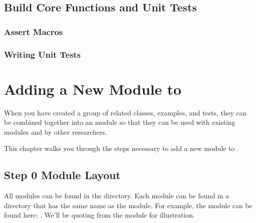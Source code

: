 \documentclass[letterpaper,10pt,english]{sphinxmanual}
\renewcommand{\sphinxcode}[1]{\texttt{\small{#1}}}
\begin{document}
\begin{sphinxVerbatim}[commandchars=\\\{\}]
  
       
     
     
     
\end{sphinxVerbatim}


\subsection{Build Core Functions and Unit Tests}
\label{\detokenize{new-models:build-core-functions-and-unit-tests}}

\subsubsection{Assert Macros}
\label{\detokenize{new-models:assert-macros}}

\subsubsection{Writing Unit Tests}
\label{\detokenize{new-models:writing-unit-tests}}

\section{Adding a New Module to }
\label{\detokenize{new-modules:adding-a-new-module-to-ns3}}\label{\detokenize{new-modules::doc}}
When you have created a group of related classes, examples, and tests,
they can be combined together into an  module so that they can be
used with existing  modules and by other researchers.

This chapter walks you through the steps necessary to add a new module
to .


\subsection{Step 0 \sphinxhyphen{} Module Layout}
\label{\detokenize{new-modules:step-0-module-layout}}\label{\detokenize{new-modules:step-0}}
All modules can be found in the \sphinxcode{} directory.  Each module can be
found in a directory that has the same name as the module.  For
example, the \sphinxcode{} module can be found here: \sphinxcode{}.
We’ll be quoting from the \sphinxcode{} module for illustration.
\end{document}
